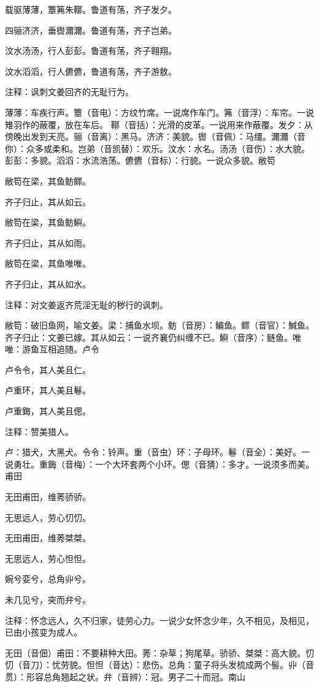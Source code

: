 \documentclass[12pt,UTF8]{ctexbook}
\begin{document}
载驱薄薄，簟笰朱鞹。鲁道有荡，齐子发夕。

四骊济济，垂辔濔濔。鲁道有荡，齐子岂弟。

汶水汤汤，行人彭彭。鲁道有荡，齐子翱翔。

汶水滔滔，行人儦儦，鲁道有荡，齐子游敖。

注释：讽刺文姜回齐的无耻行为。

薄薄：车疾行声。簟（音电）：方纹竹席。一说席作车门。笰（音浮）：车帘。一说雉羽作的蔽覆，放在车后。 鞹（音括）：光滑的皮革。一说用来作蔽覆。发夕：从傍晚出发到天亮。骊（音离）：黑马。济济：美貌。辔（音佩）：马缰。濔濔（音你）：众多或柔和。岂弟（音凯替）：欢乐。汶水：水名。汤汤（音伤）：水大貌。彭彭：多貌。滔滔：水流浩荡。儦儦（音标）：行貌。一说众多貌。敝笱

敝笱在梁，其鱼鲂鳏。

齐子归止，其从如云。

敝笱在梁，其鱼鲂鱮。

齐子归止，其从如雨。

敝笱在梁，其鱼唯唯。

齐子归止，其从如水。

注释：对文姜返齐荒淫无耻的秽行的讽刺。

敝笱：破旧鱼网，喻文姜。梁：捕鱼水坝。鲂（音房）：鳊鱼。鳏（音官）：鰔鱼。齐子归止：文姜已嫁。其从如云：一说齐襄仍纠缠不已。鱮（音序）：鲢鱼。唯唯：游鱼互相追随。卢令

卢令令，其人美且仁。

卢重环，其人美且鬈。

卢重鋂，其人美且偲。

注释：赞美猎人。

卢：猎犬，大黑犬。令令：铃声。重（音虫）环：子母环。鬈（音全）：美好。一说勇壮。重鋂（音梅）：一个大环套两个小环。偲（音猜）：多才。一说须多而美。 甫田

无田甫田，维莠骄骄。

无思远人，劳心忉忉。

无田甫田，维莠桀桀。

无思远人，劳心怛怛。

婉兮娈兮，总角丱兮。

未几见兮，突而弁兮。

注释：怀念远人，久不归家，徒劳心力。一说少女怀念少年，久不相见，及相见，已由小孩变为成人。

无田（音佃）甫田：不要耕种大田。莠：杂草；狗尾草。骄骄、桀桀：高大貌。忉忉（音刀）：忧劳貌。怛怛（音达）：悲伤。总角：童子将头发梳成两个髻。丱（音贯）：形容总角翘起之状。弁（音辨）：冠。男子二十而冠。南山
\end{document}
